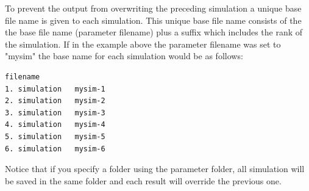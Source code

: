 \documentclass[letterpaper,12pt,oneside]{book}
\begin{document}
To prevent the output from overwriting the preceding simulation a unique base file name is given to each simulation. This unique base file name consists of the the base file name (parameter \textsf{filename}) plus a suffix which includes the rank of the simulation. If in the example above the parameter \textsf{filename} was set to "mysim" the base name for each simulation would be as follows:
\begin{lstlisting}[frame=single]
                filename
1. simulation   mysim-1
2. simulation   mysim-2
3. simulation   mysim-3
4. simulation   mysim-4
5. simulation   mysim-5
6. simulation   mysim-6
\end{lstlisting}

Notice that if you specify a folder using the parameter \textsf{folder}, all simulation will be saved in the same folder and each result will override the previous one.
\newpage
\end{document}
